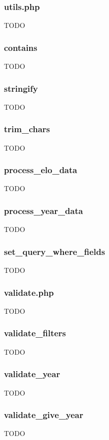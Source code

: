 \documentclass{article}
\begin{document}
\subsubsection{utils.php}
TODO

\subsubsection*{contains}
TODO

\subsubsection*{stringify}
TODO


\subsubsection*{trim\_chars}
TODO


\subsubsection*{process\_elo\_data}
TODO


\subsubsection*{process\_year\_data}
TODO


\subsubsection*{set\_query\_where\_fields}
TODO

\subsubsection{validate.php}
TODO

\subsubsection*{validate\_filters}
TODO

\subsubsection*{validate\_year}
TODO

\subsubsection*{validate\_give\_year}
TODO
\end{document}
